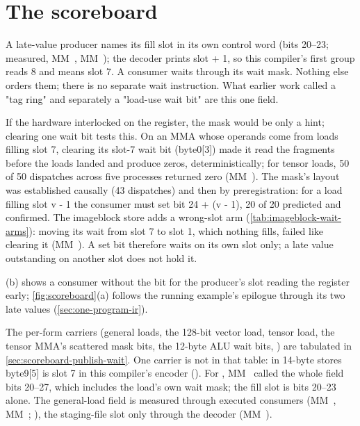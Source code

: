 \section{The scoreboard}\label{sec:scoreboard}

A late-value producer names its fill slot in its own control word (bits 20--23; measured, MM~, MM~); the decoder prints slot + 1, so this compiler's first group reads 8 and means slot 7. A consumer waits through
its wait mask. Nothing else orders them; there is no separate wait instruction. What earlier work called a "tag ring" and separately a
"load-use wait bit" are this one field.

If the hardware interlocked on the register, the mask would be only a hint; clearing one wait bit tests this. On an MMA whose operands come from loads filling slot 7, clearing its slot-7 wait bit
(byte0{[}3{]}) made it read the fragments before the loads landed and produce zeros, deterministically; for tensor loads, 50
of 50 dispatches across five processes returned zero (MM~). The mask's layout was established causally (43
dispatches) and then by preregistration: for a load filling slot v - 1 the consumer must set bit 24 + (v - 1), 20 of 20
predicted and confirmed. The imageblock store adds a wrong-slot arm (\cref{tab:imageblock-wait-arms}): moving its wait
from slot 7 to slot 1, which nothing fills, failed like clearing it (MM~). A set bit therefore waits on its own slot only;
a late value outstanding on another slot does not hold it.

(b) shows a consumer without the bit for the producer's slot reading the register early;
\cref{fig:scoreboard}(a) follows the running example's epilogue through its two late values (\cref{sec:one-program-ir}).



The per-form carriers (general loads, the 128-bit vector load, tensor load, the tensor MMA's
scattered mask bits, the 12-byte ALU wait bits, ) are tabulated in \cref{sec:scoreboard-publish-wait}. One carrier
is not in that table: in 14-byte stores byte9{[}5{]} is slot 7 in this compiler's encoder (). For
, MM~ called the whole field bits 20--27, which includes the load's own wait mask; the fill slot is
bits 20--23 alone. The general-load field is measured through executed consumers
(MM~, MM~;  ), the staging-file slot only through the decoder (MM~).

